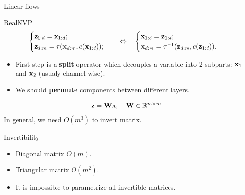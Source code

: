 \documentclass{beamer}
\begin{document}
\begin{frame}{Linear flows}
	\begin{block}{RealNVP}
		\vspace{-0.5cm}
		\begin{equation*}
			\begin{cases} \mathbf{z}_{1:d} = \mathbf{x}_{1:d}; \\ \mathbf{z}_{d:m} = \tau (\mathbf{x}_{d:m}, c(\mathbf{x}_{1:d}));\end{cases} 
			\quad \Leftrightarrow \quad 
			\begin{cases} \mathbf{x}_{1:d} = \mathbf{z}_{1:d}; \\ \mathbf{x}_{d:m} = \tau^{-1} (\mathbf{z}_{d:m}, c(\mathbf{z}_{1:d})).\end{cases}
		\end{equation*}
		\vspace{-0.2cm}
	\end{block}
	\begin{itemize}
		\item First step is a \textbf{split} operator which decouples a variable into 2 subparts: $\mathbf{x}_1$ and $\mathbf{x}_2$ (usualy channel-wise).
		\item We should \textbf{permute} components between different layers.
	\end{itemize}
	\[
	\mathbf{z} = \mathbf{W} \mathbf{x}, \quad \mathbf{W} \in \mathbb{R}^{m \times m}
	\]
	In general, we need $O(m^3)$ to invert matrix.
	\begin{block}{Invertibility}
		\begin{itemize}
			\item Diagonal matrix $O(m)$.
			\item Triangular matrix $O(m^2)$.
			\item It is impossible to parametrize all invertible matrices.
		\end{itemize}
	\end{block}
\end{frame}
\end{document}

